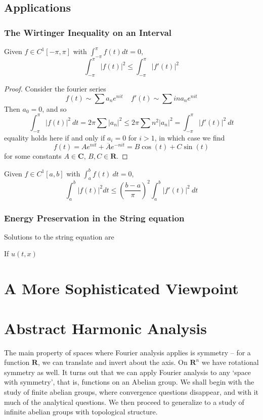 \chapter{Applications}

\section{The Wirtinger Inequality on an Interval}

\begin{theorem}
    Given $f \in C^1[-\pi,\pi]$ with $\int_{-\pi}^\pi f(t) dt = 0$,
    \[ \int_{-\pi}^\pi |f(t)|^2 \leq \int_{-\pi}^\pi |f'(t)|^2 \]
\end{theorem}
\begin{proof}
    Consider the fourier series
    \[ f(t) \sim \sum a_n e^{nit}\ \ \ \ \ f'(t) \sim \sum in a_n e^{nit} \]
    Then $a_0 = 0$, and so
    \[ \int_{-\pi}^\pi |f(t)|^2\ dt = 2 \pi \sum |a_n|^2 \leq 2 \pi \sum n^2 |a_n|^2 = \int_{-\pi}^\pi |f'(t)|^2\ dt \]
    equality holds here if and only if $a_i = 0$ for $i > 1$, in which case we find
    \[ f(t) = A e^{nit} + \overline{A} e^{-nit} = B \cos(t) + C \sin(t) \]
    for some constants $A \in \mathbf{C}$, $B,C \in \mathbf{R}$.
\end{proof}

\begin{corollary}
    Given $f \in C^1[a,b]$ with $\int_a^b f(t)\ dt = 0$, 
    \[ \int_a^b |f(t)|^2 dt \leq \left(\frac{b-a}{\pi}\right)^2 \int_a^b |f'(t)|^2\ dt \]
\end{corollary}

\section{Energy Preservation in the String equation}

Solutions to the string equation are

If $u(t,x)$

\part{A More Sophisticated Viewpoint}

\part{Abstract Harmonic Analysis}

The main property of spaces where Fourier analysis applies is symmetry -- for a function $\mathbf{R}$, we can translate and invert about the axis. On $\mathbf{R}^n$ we have rotational symmetry as well. It turns out that we can apply Fourier analysis to any `space with symmetry', that is, functions on an Abelian group. We shall begin with the study of finite abelian groups, where convergence questions disappear, and with it much of the analytical questions. We then proceed to generalize to a study of infinite abelian groups with topological structure.


